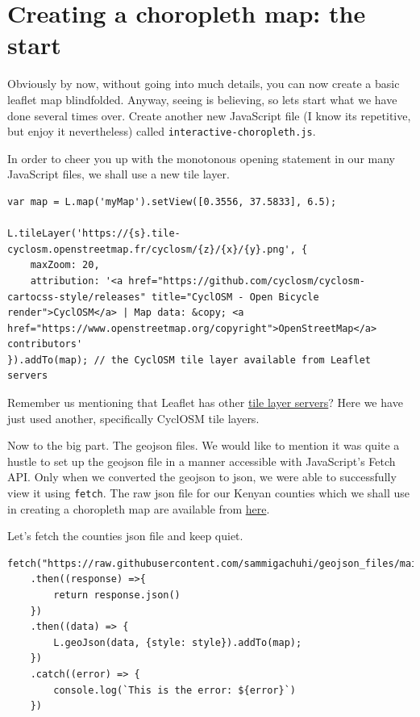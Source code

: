 \documentclass[
]{book}
\begin{document}
\hypertarget{creating-a-choropleth-map-the-start}{%
\section{Creating a choropleth map: the start}\label{creating-a-choropleth-map-the-start}}

Obviously by now, without going into much details, you can now create a basic leaflet map blindfolded. Anyway, seeing is believing, so lets start what we have done several times over. Create another new JavaScript file (I know its repetitive, but enjoy it nevertheless) called \texttt{interactive-choropleth.js}.

In order to cheer you up with the monotonous opening statement in our many JavaScript files, we shall use a new tile layer.

\begin{verbatim}
var map = L.map('myMap').setView([0.3556, 37.5833], 6.5);

L.tileLayer('https://{s}.tile-cyclosm.openstreetmap.fr/cyclosm/{z}/{x}/{y}.png', {
    maxZoom: 20,
    attribution: '<a href="https://github.com/cyclosm/cyclosm-cartocss-style/releases" title="CyclOSM - Open Bicycle render">CyclOSM</a> | Map data: &copy; <a href="https://www.openstreetmap.org/copyright">OpenStreetMap</a> contributors'
}).addTo(map); // the CyclOSM tile layer available from Leaflet servers
\end{verbatim}

Remember us mentioning that Leaflet has other \href{https://leaflet-extras.github.io/leaflet-providers/preview/}{tile layer servers}? Here we have just used another, specifically CyclOSM tile layers.

Now to the big part. The geojson files. We would like to mention it was quite a hustle to set up the geojson file in a manner accessible with JavaScript's Fetch API. Only when we converted the geojson to json, we were able to successfully view it using \texttt{fetch}. The raw json file for our Kenyan counties which we shall use in creating a choropleth map are available from \href{https://raw.githubusercontent.com/sammigachuhi/geojson_files/main/counties_json.json}{here}.

Let's fetch the counties json file and keep quiet.

\begin{verbatim}
fetch("https://raw.githubusercontent.com/sammigachuhi/geojson_files/main/counties_json.json")
    .then((response) =>{
        return response.json()
    })
    .then((data) => {
        L.geoJson(data, {style: style}).addTo(map);
    })
    .catch((error) => {
        console.log(`This is the error: ${error}`)
    })
    
\end{verbatim}
\end{document}
